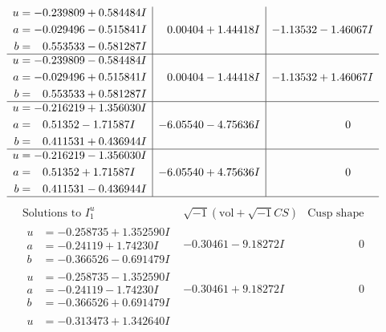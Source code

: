 \documentclass[1p]{elsarticle_modified}
\theoremstyle{definition}
\newcommand{\I}{\sqrt{-1}}
\begin{document}
$$\begin{array}{c|c|c}
\begin{aligned}
u &= -0.239809 + 0.584484 I \\
a &= -0.029496 - 0.515841 I \\
b &= \phantom{-}0.553533 - 0.581287 I\end{aligned}
 & \phantom{-}0.00404 + 1.44418 I & -1.13532 - 1.46067 I \\ \hline\begin{aligned}
u &= -0.239809 - 0.584484 I \\
a &= -0.029496 + 0.515841 I \\
b &= \phantom{-}0.553533 + 0.581287 I\end{aligned}
 & \phantom{-}0.00404 - 1.44418 I & -1.13532 + 1.46067 I \\ \hline\begin{aligned}
u &= -0.216219 + 1.356030 I \\
a &= \phantom{-}0.51352 - 1.71587 I \\
b &= \phantom{-}0.411531 + 0.436944 I\end{aligned}
 & -6.05540 - 4.75636 I & \phantom{-0.000000 } 0 \\ \hline\begin{aligned}
u &= -0.216219 - 1.356030 I \\
a &= \phantom{-}0.51352 + 1.71587 I \\
b &= \phantom{-}0.411531 - 0.436944 I\end{aligned}
 & -6.05540 + 4.75636 I & \phantom{-0.000000 } 0\\
 \hline 
 \end{array}$$\newpage$$\begin{array}{c|c|c}  
\text{Solutions to }I^u_{1}& \I (\text{vol} + \sqrt{-1}CS) & \text{Cusp shape}\\
 \hline 
\begin{aligned}
u &= -0.258735 + 1.352590 I \\
a &= -0.24119 + 1.74230 I \\
b &= -0.366526 - 0.691479 I\end{aligned}
 & -0.30461 - 9.18272 I & \phantom{-0.000000 } 0 \\ \hline\begin{aligned}
u &= -0.258735 - 1.352590 I \\
a &= -0.24119 - 1.74230 I \\
b &= -0.366526 + 0.691479 I\end{aligned}
 & -0.30461 + 9.18272 I & \phantom{-0.000000 } 0 \\ \hline\begin{aligned}
u &= -0.313473 + 1.342640 I \\

\end{aligned}
\end{array}$$
\end{document}
